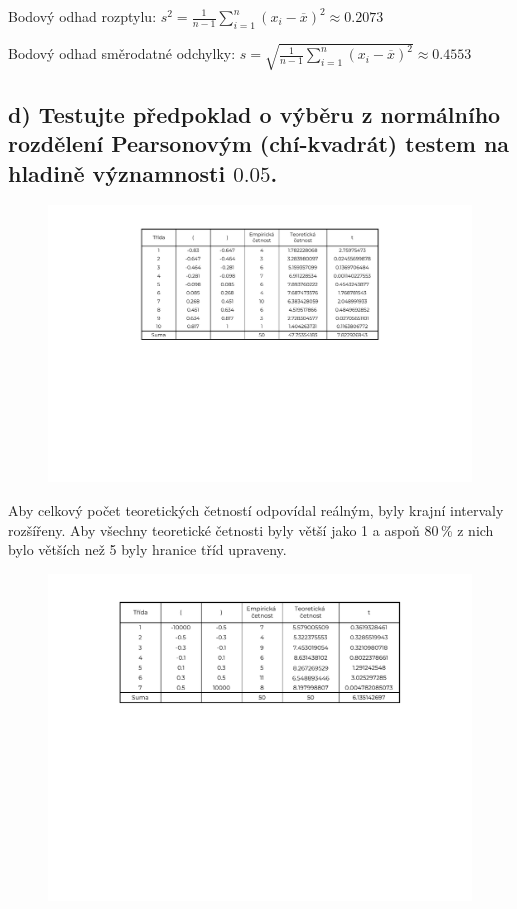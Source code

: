 \documentclass[11pt, a4paper, titlepage]{article}
\begin{document}
Bodový odhad rozptylu: ${\displaystyle s^2 = {\frac {1}{n-1}} \sum_{i=1}^{n}(x_i - \overline{x})^2} \approx 0.2073$
\smallskip

Bodový odhad směrodatné odchylky: ${\displaystyle s = \sqrt{{\frac {1}{n-1}} \sum_{i=1}^{n}(x_i - \overline{x})^2}} \approx 0.4553$
\bigskip

\noindent\makebox[\linewidth]{\rule{\paperwidth}{0.3pt}}


\subsection*{d) Testujte předpoklad o výběru z normálního rozdělení Pearsonovým (chí-kvadrát) testem na hladině významnosti $0.05$.}

\begin{figure}[H]
    \centering
    \includegraphics[width=.98\linewidth]{images/1-d-1-crop.pdf}
\end{figure}

Aby celkový počet teoretických četností odpovídal reálným, byly krajní intervaly rozšířeny. Aby všechny teoretické četnosti byly větší jako 1 a aspoň 80\,\% z nich bylo větších než 5 byly hranice tříd upraveny.

\begin{figure}[H]
    \centering
    \includegraphics[width=.98\linewidth]{images/1-d-2-crop.pdf}
\end{figure}
\bigskip
\end{document}
